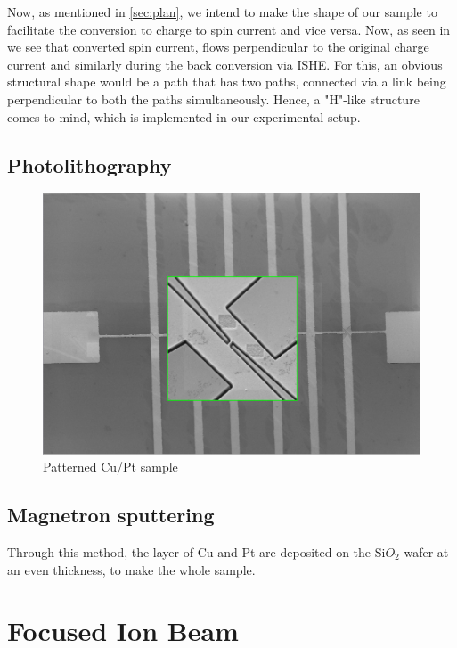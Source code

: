 Now, as mentioned in \cref{sec:plan}, we intend to make the shape of our sample to facilitate the conversion to charge to spin current and vice versa.
Now, as seen in %
we see that converted spin current, flows perpendicular to the original charge current and similarly during the back conversion via ISHE.
For this, an obvious structural shape would be a path that has two paths, connected via a link being perpendicular to both the paths simultaneously.
Hence, a "H"-like structure comes to mind, which is implemented in our experimental setup.

\subsection{Photolithography}

\begin{figure}[h!]
    \includegraphics[width=\columnwidth]{newtrack.png}
    \caption{Patterned Cu/Pt sample}
\end{figure}

\subsection{Magnetron sputtering}

Through this method, the layer of Cu and Pt are deposited on the Si$O_2$ wafer at an even thickness, to make the whole sample.

\section{Focused Ion Beam}



